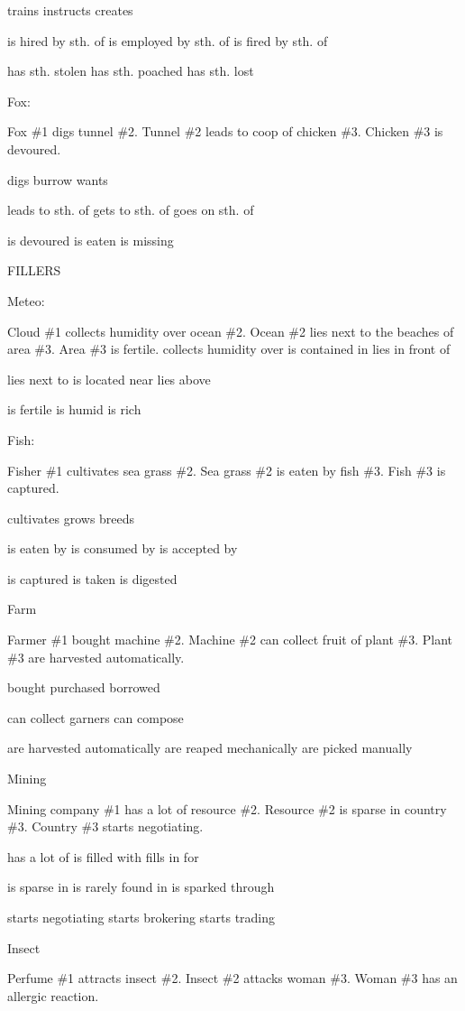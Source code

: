 trains
instructs
creates

is hired by sth. of
is employed by sth. of
is fired by sth. of

has sth. stolen
has sth. poached
has sth. lost


Fox:

Fox \#1 digs tunnel \#2.
Tunnel \#2 leads to coop of chicken \#3.
Chicken \#3 is devoured.

digs
burrow
wants

leads to sth. of
gets to sth. of
goes on sth. of

is devoured
is eaten
is missing



FILLERS

Meteo:

Cloud \#1 collects humidity over ocean \#2.
Ocean \#2 lies next to the beaches of area \#3.
Area \#3 is fertile.
collects humidity over
is contained in
lies in front of

lies next to
is located near
lies above

is fertile
is humid
is rich


Fish:

Fisher \#1 cultivates sea grass \#2.
Sea grass \#2 is eaten by fish \#3.
Fish \#3 is captured.

cultivates
grows
breeds

is eaten by
is consumed by
is accepted by

is captured
is taken
is digested


Farm

Farmer \#1 bought machine \#2.
Machine \#2 can collect fruit of plant \#3.
Plant \#3 are harvested automatically.

bought
purchased
borrowed

can collect
garners
can compose

are harvested automatically
are reaped mechanically
are picked manually

Mining

Mining company \#1 has a lot of resource \#2.
Resource \#2 is sparse in country \#3.
Country \#3 starts negotiating.

has a lot of
is filled with
fills in for

is sparse in
is rarely found in
is sparked through

starts negotiating
starts brokering
starts trading


Insect

Perfume \#1 attracts insect \#2.
Insect \#2 attacks woman \#3.
Woman \#3 has an allergic reaction.

